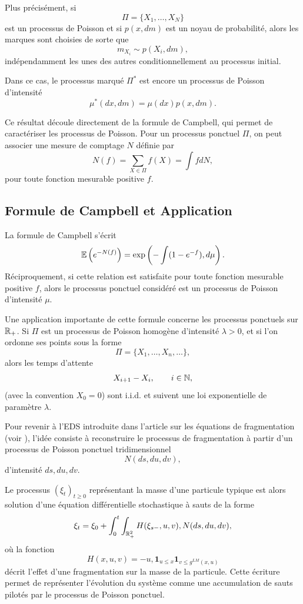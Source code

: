 Plus précisément, si
\[
	\Pi = \{X_1,\dots,X_N\}
\]
est un processus de Poisson et si $p(x,dm)$ est un noyau de probabilité, alors les marques sont choisies de sorte que
\[
	m_{X_i} \sim p(X_i,dm),
\]
indépendamment les unes des autres conditionnellement au processus initial.

\begin{important}
	Dans ce cas, le processus marqué $\Pi^*$ est encore un processus de Poisson d'intensité
	\[
		\mu^*(dx,dm)=\mu(dx)p(x,dm).
	\]
\end{important}

Ce résultat découle directement de la formule de Campbell, qui permet de caractériser les processus de Poisson. Pour un processus ponctuel $\Pi$, on peut associer une mesure de comptage $N$ définie par
\[
	N(f)=\sum_{X\in\Pi} f(X)=\int fdN,
\]
pour toute fonction mesurable positive $f$.

\subsection{Formule de Campbell et Application}

\begin{important}
	La formule de Campbell s'écrit
	\[
		\mathbb{E}\left(e^{-N(f)}\right)
		=
		\exp\left(
		-\int (1-e^{-f}),d\mu
		\right).
	\]
	Réciproquement, si cette relation est satisfaite pour toute fonction mesurable positive $f$, alors le processus ponctuel considéré est un processus de Poisson d'intensité $\mu$.
\end{important}

Une application importante de cette formule concerne les processus ponctuels sur $\mathbb{R}_+$. Si $\Pi$ est un processus de Poisson homogène d'intensité $\lambda>0$, et si l'on ordonne ses points sous la forme
\[
	\Pi=\{X_1,\dots,X_n,\dots\},
\]
alors les temps d'attente
\[
	X_{i+1}-X_i,
	\qquad i\in\mathbb{N},
\]
(avec la convention $X_0=0$) sont i.i.d. et suivent une loi exponentielle de paramètre $\lambda$.

Pour revenir à l'EDS introduite dans l'article sur les équations de fragmentation (voir \cite{frag_deaconu}), l'idée consiste à reconstruire le processus de fragmentation à partir d'un processus de Poisson ponctuel tridimensionnel
\[
	N(ds,du,dv),
\]
d'intensité $ds,du,dv$.

\begin{important}
	Le processus $(\xi_t)_{t\geq0}$ représentant la masse d'une particule typique est alors solution d'une équation différentielle stochastique à sauts de la forme
	\[
		\xi_t =
		\xi_0
		+
		\int_0^t\int_{\mathbb{R}_+^2}
		H(\xi_{s-},u,v),N(ds,du,dv),
	\]
	où la fonction
	\[
		H(x,u,v) =
		-u,\mathbf 1_{{u\le x}}\mathbf 1_{{v\le g^{LM}(x,u)}}
	\]
	décrit l'effet d'une fragmentation sur la masse de la particule. Cette écriture permet de représenter l'évolution du système comme une accumulation de sauts pilotés par le processus de Poisson ponctuel.
\end{important}

